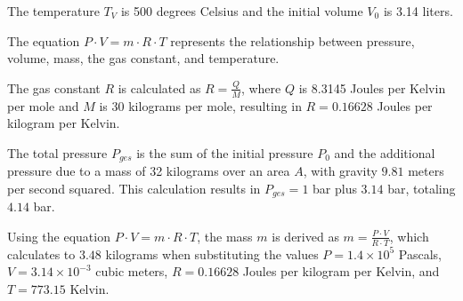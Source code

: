 The temperature \( T_V \) is 500 degrees Celsius and the initial volume \( V_0 \) is 3.14 liters.

The equation \( P \cdot V = m \cdot R \cdot T \) represents the relationship between pressure, volume, mass, the gas constant, and temperature.

The gas constant \( R \) is calculated as \( R = \frac{Q}{M} \), where \( Q \) is 8.3145 Joules per Kelvin per mole and \( M \) is 30 kilograms per mole, resulting in \( R = 0.16628 \) Joules per kilogram per Kelvin.

The total pressure \( P_{ges} \) is the sum of the initial pressure \( P_0 \) and the additional pressure due to a mass of 32 kilograms over an area \( A \), with gravity \( 9.81 \) meters per second squared. This calculation results in \( P_{ges} = 1 \) bar plus \( 3.14 \) bar, totaling \( 4.14 \) bar.

Using the equation \( P \cdot V = m \cdot R \cdot T \), the mass \( m \) is derived as \( m = \frac{P \cdot V}{R \cdot T} \), which calculates to \( 3.48 \) kilograms when substituting the values \( P = 1.4 \times 10^5 \) Pascals, \( V = 3.14 \times 10^{-3} \) cubic meters, \( R = 0.16628 \) Joules per kilogram per Kelvin, and \( T = 773.15 \) Kelvin.